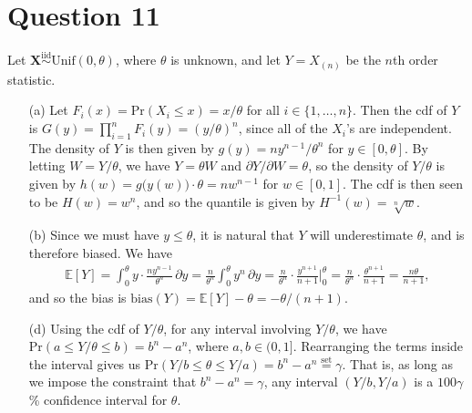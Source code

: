 \documentclass[10pt]{article}
\begin{document}
\section{Question 11} \noindent
Let \(\bm{X} \overset{\mathrm{iid}}{\sim} \mathrm{Unif}(0, \theta)\), where \(\theta\) is unknown, and let \(Y = X_{(n)}\) be the \(n\)th order statistic. 
\begin{itemize}
    \item[(a)] Let \(F_i(x) = \mathrm{Pr}(X_i \le x) = x / \theta\) for all \(i \in \{1, \ldots, n\}\). Then the cdf of \(Y\) is 
    \(G(y) = \prod_{i = 1}^n F_i(y) = \left( y / \theta \right)^n\), since all of the \(X_i\)'s are independent. The density of \(Y\) is then given by 
    \(g(y) = n y^{n - 1} / \theta^n\) for \(y \in [0, \theta]\). By letting \(W = Y / \theta\), we have \(Y = \theta W\) and \(\partial Y / \partial W = \theta\), 
    so the density of \(Y / \theta\) is given by \(h(w) = g\big( y(w) \big) \cdot \theta = n w^{n-1}\) for \(w \in [0,1]\). The cdf is then seen to be 
    \(H(w) = w^n\), and so the quantile is given by \(H^{-1}(w) = \sqrt[n]{w}\).
    \item[(b)] Since we must have \(y \le \theta\), it is natural that \(Y\) will underestimate \(\theta\), and is therefore biased. We have 
    \begin{align*}
        \mathbb{E}[Y]
        = \int_{0}^{\theta} y \cdot \frac{n y^{n-1}}{\theta^n} \,\partial y
        = \frac{n}{\theta^n} \int_0^{\theta} y^n \,\partial y
        = \frac{n}{\theta^n} \cdot \frac{y^{n+1}}{n+1} \bigg|_{0}^{\theta}
        = \frac{n}{\theta^n} \cdot \frac{\theta^{n+1}}{n+1}
        = \frac{n\theta}{n+1},
    \end{align*}
    and so the bias is \(\mathrm{bias}(Y) = \mathbb{E}[Y] - \theta = -\theta / (n+1)\). 
    \item[(d)] Using the cdf of \(Y / \theta\), for any interval involving \(Y / \theta\), we have \(\mathrm{Pr}(a \le Y / \theta \le b) = b^n - a^n\), where 
    \(a, b \in (0, 1]\). Rearranging the terms inside the interval gives us \(\mathrm{Pr}(Y / b \le \theta \le Y / a) = b^n - a^n \overset{\mathrm{set}}{=} \gamma\).
    That is, as long as we impose the constraint that \(b^n - a^n = \gamma\), any interval \((Y/b, Y/a)\) is a \(100\gamma\)\%{} confidence interval for \(\theta\). 
\end{itemize}
\end{document}
